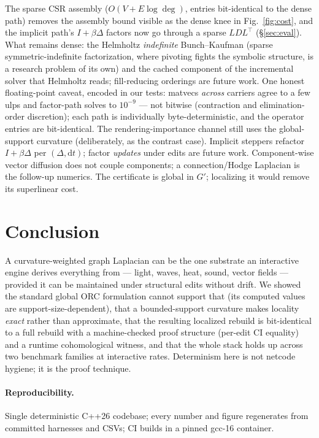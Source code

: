 The sparse CSR assembly ($O(V + E\log\deg)$, entries bit-identical to the
dense path) removes the assembly bound visible as the dense knee in
Fig.~\ref{fig:cost}, and the implicit path's $I+\beta\Delta$ factors now go
through a sparse $LDL^\top$ (\S\ref{sec:eval}). What remains dense: the
Helmholtz \emph{indefinite} Bunch--Kaufman (sparse symmetric-indefinite
factorization, where pivoting fights the symbolic structure, is a research
problem of its own) and the cached component of the incremental solver that
Helmholtz reads; fill-reducing orderings are future work. One honest
floating-point caveat, encoded in our tests: matvecs \emph{across} carriers
agree to a few ulps and factor-path solves to $10^{-9}$ --- not bitwise
(contraction and elimination-order discretion); each path is individually
byte-deterministic, and the operator entries are bit-identical. The rendering-importance channel still uses the
global-support curvature (deliberately, as the contrast case). Implicit
steppers refactor $I + \beta\Delta$ per $(\Delta, \mathrm{d}t)$; factor
\emph{updates} under edits are future work. Component-wise vector diffusion
does not couple components; a connection/Hodge Laplacian is the follow-up
numerics. The certificate is global in $G'$; localizing it would remove its
superlinear cost.

\section{Conclusion}

A curvature-weighted graph Laplacian can be the one substrate an interactive
engine derives everything from --- light, waves, heat, sound, vector fields
--- provided it can be maintained under structural edits without drift. We
showed the standard global ORC formulation cannot support that (its computed
values are support-size-dependent), that a bounded-support curvature makes
locality \emph{exact} rather than approximate, that the resulting localized
rebuild is bit-identical to a full rebuild with a machine-checked proof
structure (per-edit CI equality) and a runtime cohomological witness, and
that the whole stack holds up across two benchmark families at interactive
rates. Determinism here is not netcode hygiene; it is the proof technique.

\paragraph*{Reproducibility.}
Single deterministic C++26 codebase; every number and figure regenerates
from committed harnesses and CSVs; CI builds in a pinned gcc-16 container.
